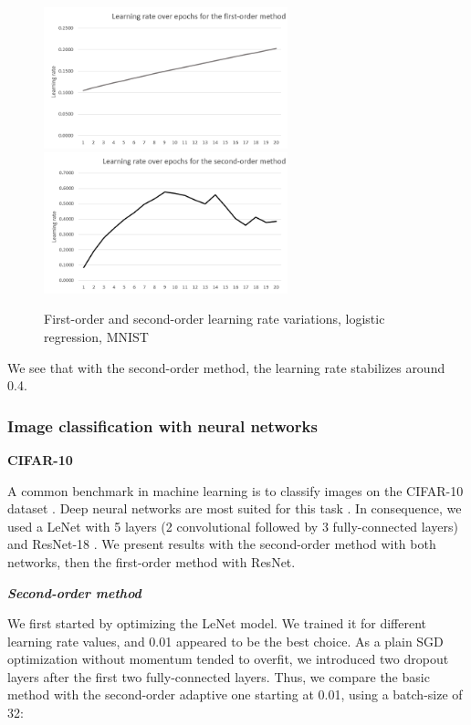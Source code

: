 \documentclass{article}
\begin{document}
  \begin{figure}[!h]
	\includegraphics[width=200pt]{lr_logistic_1st_order.png}
	\includegraphics[width=200pt]{lr_logistic_2nd_order.png}
	\caption{First-order and second-order learning rate variations, logistic regression, MNIST}
  \end{figure} 

  We see that with the second-order method, the learning rate stabilizes around 0.4. 

  \newpage
  \subsubsection{Image classification with neural networks}
  
  \textbf{CIFAR-10}
  
  A common benchmark in machine learning is to classify images on the CIFAR-10 dataset \cite{cifar}. Deep neural networks are most suited for this task \cite{krizhevsky2012imagenet}. In consequence, we used a LeNet with 5 layers (2 convolutional followed by 3 fully-connected layers) and ResNet-18 \cite{he2016deep}. We present results with the second-order method with both networks, then the first-order method with ResNet.
  
  \emph{\textbf{Second-order method}}
  
  We first started by optimizing the LeNet model. We trained it for different learning rate values, and 0.01 appeared to be the best choice. As a plain SGD optimization without momentum tended to overfit, we introduced two dropout layers after the first two fully-connected layers. Thus, we compare the basic method with the second-order adaptive one starting at 0.01, using a batch-size of 32:\\
  
\end{document}
